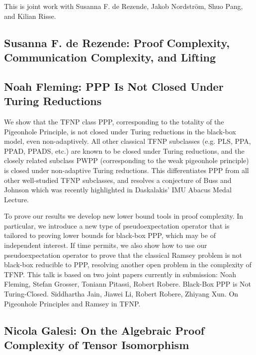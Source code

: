 \documentclass[11pt]{article}
\begin{document}
This is joint work with Susanna F. de Rezende, Jakob Nordström, Shuo Pang, and Kilian Risse. 

\subsection*{Susanna F. de Rezende:
  Proof Complexity, Communication Complexity, and Lifting   
}\label{Rezende}


\subsection*{Noah Fleming: PPP Is Not Closed Under Turing Reductions}\label{Fleming}

We show that the TFNP class PPP, corresponding to the totality of the Pigeonhole Principle, is not closed under Turing reductions in the black-box model, even non-adaptively. All other classical TFNP subclasses (e.g. PLS, PPA, PPAD, PPADS, etc.) are known to be closed under Turing reductions, and the closely related subclass PWPP (corresponding to the weak pigeonhole principle) is closed under non-adaptive Turing reductions. This differentiates PPP from all other well-studied TFNP subclasses, and resolves a conjecture of Buss and Johnson which was recently highlighted in Daskalakis’ IMU Abacus Medal Lecture. 

To prove our results we develop new lower bound tools in proof complexity. In particular, we introduce a new type of pseudoexpectation operator that is tailored to proving lower bounds for black-box PPP, which may be of independent interest. If time permits, we also show how to use our pseudoexpectation operator to prove that the classical Ramsey problem is not black-box reducible to PPP, resolving another open problem in the complexity of TFNP. This talk is based on two joint papers currently in submission: Noah Fleming, Stefan Grosser, Toniann Pitassi, Robert Robere. Black-Box PPP is Not Turing-Closed. Siddhartha Jain, Jiawei Li, Robert Robere, Zhiyang Xun. On Pigeonhole Principles and Ramsey in TFNP.

\subsection*{Nicola Galesi: On the Algebraic Proof Complexity of Tensor Isomorphism}\label{Galesi}
\end{document}
